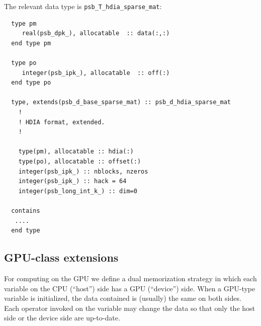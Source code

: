 The relevant data type is \verb|psb_T_hdia_sparse_mat|:
{\small
\begin{lstlisting}
  type pm
     real(psb_dpk_), allocatable  :: data(:,:)
  end type pm

  type po
     integer(psb_ipk_), allocatable  :: off(:)
  end type po

  type, extends(psb_d_base_sparse_mat) :: psb_d_hdia_sparse_mat
    !
    ! HDIA format, extended.
    !
    
    type(pm), allocatable :: hdia(:)
    type(po), allocatable :: offset(:)
    integer(psb_ipk_) :: nblocks, nzeros
    integer(psb_ipk_) :: hack = 64
    integer(psb_long_int_k_) :: dim=0

  contains
   ....
  end type
\end{lstlisting}
}



\subsection{GPU-class extensions}

For computing on the GPU we define a dual memorization strategy in
which each variable on the CPU (``host'') side has a GPU (``device'')
side. When a GPU-type variable is initialized, the data contained is
(usually) the same on both sides. Each operator invoked on the
variable may change the data so that only the host side or the device
side are up-to-date. 

